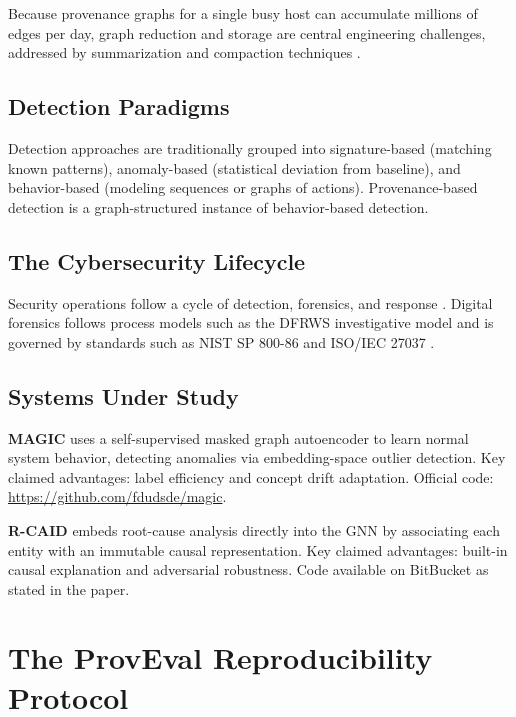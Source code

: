 \documentclass[11pt,a4paper]{article}
\newcommand{\system}[1]{\textsc{#1}}
\begin{document}
Because provenance graphs for a single busy host can accumulate millions of edges per day, graph reduction and storage are central engineering challenges, addressed by summarization and compaction techniques \cite{manzoor2016streamspot}.

\subsection{Detection Paradigms}

Detection approaches are traditionally grouped into signature-based (matching known patterns), anomaly-based (statistical deviation from baseline), and behavior-based (modeling sequences or graphs of actions). Provenance-based detection is a graph-structured instance of behavior-based detection.

\subsection{The Cybersecurity Lifecycle}

Security operations follow a cycle of detection, forensics, and response \cite{nist2012incident}. Digital forensics follows process models such as the DFRWS investigative model \cite{dfrws2001} and is governed by standards such as NIST SP 800-86 \cite{nist2006forensics} and ISO/IEC 27037 \cite{iso2012}.

\subsection{Systems Under Study}

\textbf{\system{MAGIC}} \cite{jia2024magic} uses a self-supervised masked graph autoencoder to learn normal system behavior, detecting anomalies via embedding-space outlier detection. Key claimed advantages: label efficiency and concept drift adaptation. Official code: \url{https://github.com/fdudsde/magic}.

\textbf{\system{R-CAID}} \cite{goyal2024rcaid} embeds root-cause analysis directly into the GNN by associating each entity with an immutable causal representation. Key claimed advantages: built-in causal explanation and adversarial robustness. Code available on BitBucket as stated in the paper.

\section{The ProvEval Reproducibility Protocol}
\label{sec:protocol}
\end{document}
